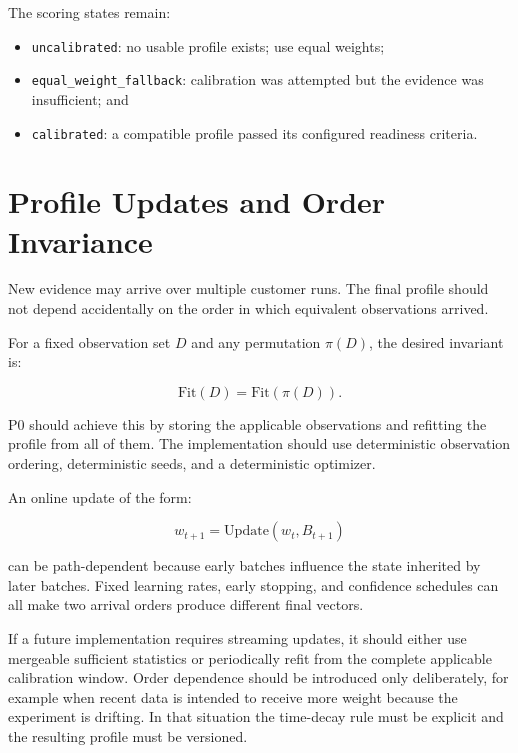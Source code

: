 \documentclass[11pt]{article}
\begin{document}
The scoring states remain:

\begin{itemize}
    \item \texttt{uncalibrated}: no usable profile exists; use equal weights;
    \item \texttt{equal\_weight\_fallback}: calibration was attempted but the
    evidence was insufficient; and
    \item \texttt{calibrated}: a compatible profile passed its configured
    readiness criteria.
\end{itemize}

\section{Profile Updates and Order Invariance}

New evidence may arrive over multiple customer runs. The final profile should
not depend accidentally on the order in which equivalent observations arrived.

For a fixed observation set \(D\) and any permutation \(\pi(D)\), the desired
invariant is:

\begin{equation}
\mathrm{Fit}(D)
=
\mathrm{Fit}(\pi(D)).
\end{equation}

P0 should achieve this by storing the applicable observations and refitting the
profile from all of them. The implementation should use deterministic
observation ordering, deterministic seeds, and a deterministic optimizer.

An online update of the form:

\begin{equation}
w_{t+1}
=
\mathrm{Update}(w_t, B_{t+1})
\end{equation}

can be path-dependent because early batches influence the state inherited by
later batches. Fixed learning rates, early stopping, and confidence schedules
can all make two arrival orders produce different final vectors.

If a future implementation requires streaming updates, it should either use
mergeable sufficient statistics or periodically refit from the complete
applicable calibration window. Order dependence should be introduced only
deliberately, for example when recent data is intended to receive more weight
because the experiment is drifting. In that situation the time-decay rule must
be explicit and the resulting profile must be versioned.
\end{document}
